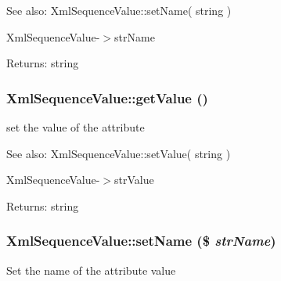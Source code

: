 \begin{Desc}
\item[See also:]XmlSequenceValue::setName( string ) 

XmlSequenceValue-$>$strName \end{Desc}
\begin{Desc}
\item[Returns:]string \end{Desc}
\hypertarget{class_xml_sequence_value_6a7ae3d278b686a9978e02298d8a432b}{
\subsubsection[{getValue}]{\setlength{\rightskip}{0pt plus 5cm}XmlSequenceValue::getValue ()}}
\label{class_xml_sequence_value_6a7ae3d278b686a9978e02298d8a432b}


set the value of the attribute

\begin{Desc}
\item[See also:]XmlSequenceValue::setValue( string ) 

XmlSequenceValue-$>$strValue \end{Desc}
\begin{Desc}
\item[Returns:]string \end{Desc}
\hypertarget{class_xml_sequence_value_fbc33798f5add98a547e139640e700ec}{
\subsubsection[{setName}]{\setlength{\rightskip}{0pt plus 5cm}XmlSequenceValue::setName (\$ {\em strName})}}
\label{class_xml_sequence_value_fbc33798f5add98a547e139640e700ec}


Set the name of the attribute value


